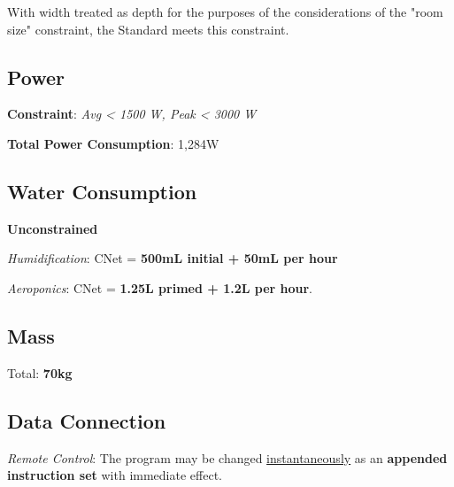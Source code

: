 \documentclass{../tex/report}
\begin{document}
With width treated as depth for the purposes of the considerations of the "room size" constraint, the Standard meets this constraint.

\subsection{Power}

\textbf{Constraint}: \textit{Avg < 1500 W, Peak < 3000 W}


\textbf{Total Power Consumption}: 1,284W

\subsection{Water Consumption}

\textbf{Unconstrained}


\textit{Humidification}: CNet = \textbf{500mL initial + 50mL per hour}

\textit{Aeroponics}: CNet = \textbf{1.25L primed + 1.2L per hour}.

\subsection{Mass}


Total: \textbf{70kg}

\subsection{Data Connection}

\textit{Remote Control}: The program may be changed \uline{instantaneously} as an \textbf{appended instruction set} with immediate effect.
\end{document}
